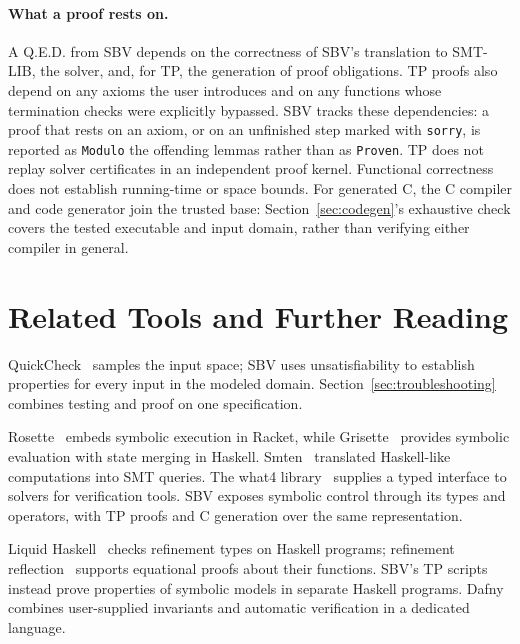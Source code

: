 \documentclass[acmsmall,screen,review,anonymous,nonacm]{acmart}
\newcommand{\code}[1]{\texttt{#1}}
\begin{document}
\paragraph{What a proof rests on.}
A Q.E.D. from SBV depends on the correctness of SBV's translation to SMT-LIB, the
solver, and, for TP, the generation of proof obligations. TP proofs also depend on
any axioms the user introduces and on any functions whose termination checks
were explicitly bypassed. SBV tracks these dependencies: a proof that rests on an
axiom, or on an unfinished step marked with \code{sorry}, is reported as
\code{Modulo} the offending lemmas rather than as \code{Proven}. TP does not replay solver certificates in an independent proof
kernel. Functional correctness does not establish running-time or space bounds.
For generated C, the C compiler and code generator join the trusted base:
Section~\ref{sec:codegen}'s exhaustive check covers the tested executable and
input domain, rather than verifying either compiler in general.

\section{Related Tools and Further Reading}
\label{sec:related}

QuickCheck~\citep{quickcheck} samples the input space; SBV uses
unsatisfiability to establish properties for every input in the modeled domain.
Section~\ref{sec:troubleshooting} combines testing and proof on one specification.

Rosette~\citep{rosette} embeds symbolic execution in Racket, while
Grisette~\citep{grisette} provides symbolic evaluation with state merging in
Haskell. Smten~\citep{smten} translated Haskell-like computations into SMT
queries. The what4 library~\citep{what4} supplies a typed interface to solvers
for verification tools. SBV exposes symbolic control through its types and
operators, with TP proofs and C generation over the same representation.

Liquid Haskell~\citep{liquidhaskell} checks refinement types on Haskell
programs; refinement reflection~\citep{reflection} supports equational proofs
about their functions. SBV's TP scripts instead prove properties of symbolic
models in separate Haskell programs. Dafny~\citep{dafny} combines user-supplied
invariants and automatic verification in a dedicated language.

\end{document}
